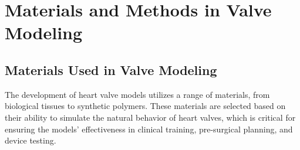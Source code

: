 \section{Materials and Methods in Valve Modeling}

\subsection{Materials Used in Valve Modeling}
The development of heart valve models utilizes a range of materials, from biological tissues to synthetic polymers. These materials are selected based on their ability to simulate the natural behavior of heart valves, which is critical for ensuring the models' effectiveness in clinical training, pre-surgical planning, and device testing.
